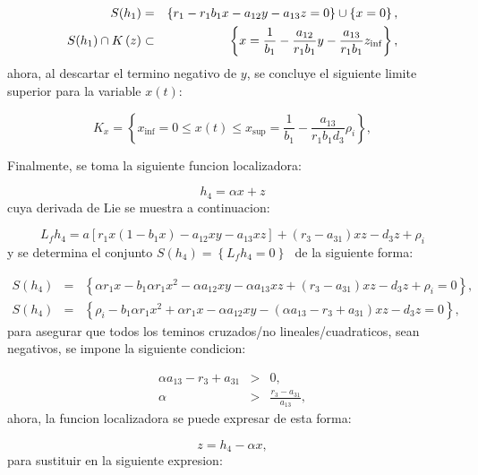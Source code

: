 \documentclass[letterpaper,11pt]{article}
\begin{document}
\begin{eqnarray*}
S(h_{1}) &=&\left\{ r_{1}-r_{1}b_{1}x-a_{12}y-a_{13}z=0\right\} \cup \left\{
x=0\right\} , \\
S(h_{1})\cap K\left( z\right) &\subset &\left\{ x=\frac{1}{b_{1}}-\frac{%
a_{12}}{r_{1}b_{1}}y-\frac{a_{13}}{r_{1}b_{1}}z_{\inf }\right\} ,
\end{eqnarray*}%
ahora, al descartar el termino negativo de $y$, se concluye el siguiente
limite superior para la variable $x\left( t\right) $:

\begin{equation*}
K_{x}=\left\{ x_{\inf }=0\leq x\left( t\right) \leq x_{\sup }=\frac{1}{b_{1}}%
-\frac{a_{13}}{r_{1}b_{1}d_{3}}\rho _{i}\right\} ,
\end{equation*}

Finalmente, se toma la siguiente funcion localizadora:

\begin{equation*}
h_{4}=\alpha x+z
\end{equation*}%
cuya derivada de Lie se muestra a continuacion:

\begin{equation*}
L_{f}h_{4}=a\left[ r_{1}x(1-b_{1}x)-a_{12}xy-a_{13}xz\right] +\left(
r_{3}-a_{31}\right) xz-d_{3}z+\rho _{i}
\end{equation*}%
y se determina el conjunto $S\left( h_{4}\right) =\left\{
L_{f}h_{4}=0\right\} \,$\ de la siguiente forma:

\begin{eqnarray*}
S\left( h_{4}\right) &=&\left\{ \alpha r_{1}x-b_{1}\alpha r_{1}x^{2}-\alpha
a_{12}xy-\alpha a_{13}xz+\left( r_{3}-a_{31}\right) xz-d_{3}z+\rho
_{i}=0\right\} , \\
S\left( h_{4}\right) &=&\left\{ \rho _{i}-b_{1}\alpha r_{1}x^{2}+\alpha
r_{1}x-\alpha a_{12}xy-\left( \alpha a_{13}-r_{3}+a_{31}\right)
xz-d_{3}z=0\right\} ,
\end{eqnarray*}%
para asegurar que todos los teminos cruzados/no lineales/cuadraticos, sean
negativos, se impone la siguiente condicion:

\begin{eqnarray*}
\alpha a_{13}-r_{3}+a_{31} &>&0, \\
\alpha &>&\frac{r_{3}-a_{31}}{a_{13}},
\end{eqnarray*}%
ahora, la funcion localizadora se puede expresar de esta forma:

\begin{equation*}
z=h_{4}-\alpha x,
\end{equation*}%
para sustituir en la siguiente expresion:
\end{document}
